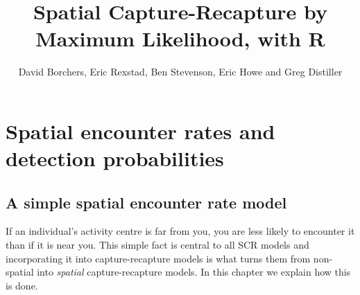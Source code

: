 \documentclass[graybox,envcountchap,sectrefs]{SpringerStyleFiles/styles/svmono}\usepackage[]{graphicx}\usepackage[]{color}
\begin{document}

\author{David Borchers, Eric Rexstad, Ben Stevenson, Eric Howe and Greg Distiller}
\title{Spatial Capture-Recapture by Maximum Likelihood, with R}
\maketitle

\frontmatter%


\tableofcontents



\mainmatter%




\chapter{Spatial encounter rates and detection probabilities}
\label{chap:ER+detfun}


\section{A simple spatial encounter rate model}
\label{sec:ER+detfun.simple.ER.model}

If an individual's activity centre is far from you, you are less likely to encounter it than if it is near you. This simple fact is central to all SCR models and incorporating it into capture-recapture models is what turns them from non-spatial into \textit{spatial} capture-recapture models. In this chapter we explain how this is done. 
\end{document}
